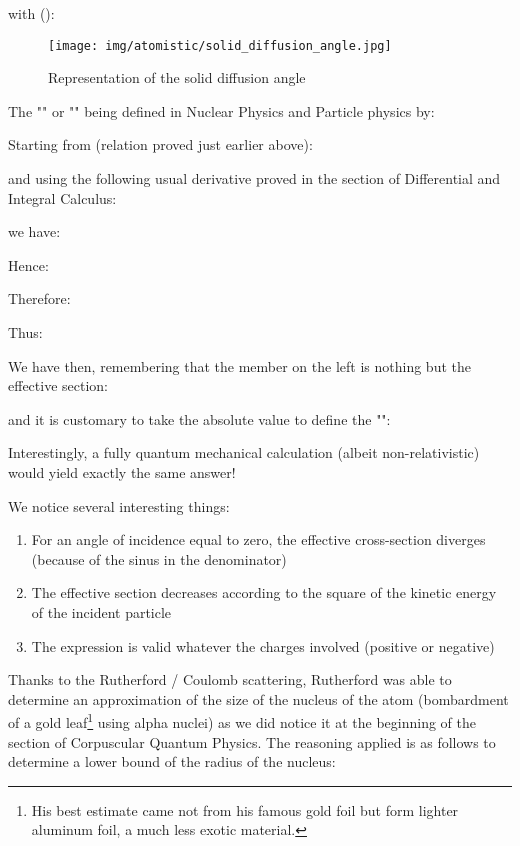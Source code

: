 	with ():
	
	\begin{figure}[H]
		\centering
		\texttt{[image: img/atomistic/solid\_diffusion\_angle.jpg]}
		\caption{Representation of the solid diffusion angle}
	\end{figure}
	The "" or "" being defined in Nuclear Physics and Particle physics by:
	
	Starting from (relation proved just earlier above):
	
	and using the following usual derivative proved in the section of Differential and Integral Calculus:
	
	we have:
	
	Hence:
	
	Therefore:
	
	Thus:
	
	We have then, remembering that the member on the left is nothing but the effective section:
	
	and it is customary to take the absolute value to define the "":
	
	Interestingly, a fully quantum mechanical calculation (albeit non-relativistic) would yield exactly the same answer!
	
	We notice several interesting things:
	\begin{enumerate}
		\item For an angle of incidence equal to zero, the effective cross-section diverges (because of the sinus in the denominator)

		\item The effective section decreases according to the square of the kinetic energy of the incident particle

		\item The expression is valid whatever the charges involved (positive or negative)
	\end{enumerate}
	Thanks to the Rutherford / Coulomb scattering, Rutherford was able to determine an approximation of the size of the nucleus of the atom (bombardment of a gold leaf\footnote{His best estimate came not from his famous gold foil but form lighter aluminum foil, a much less exotic material.} using alpha nuclei) as we did notice it at the beginning of the section of Corpuscular Quantum Physics. The reasoning applied is as follows to determine a lower bound of the radius of the nucleus:
	

